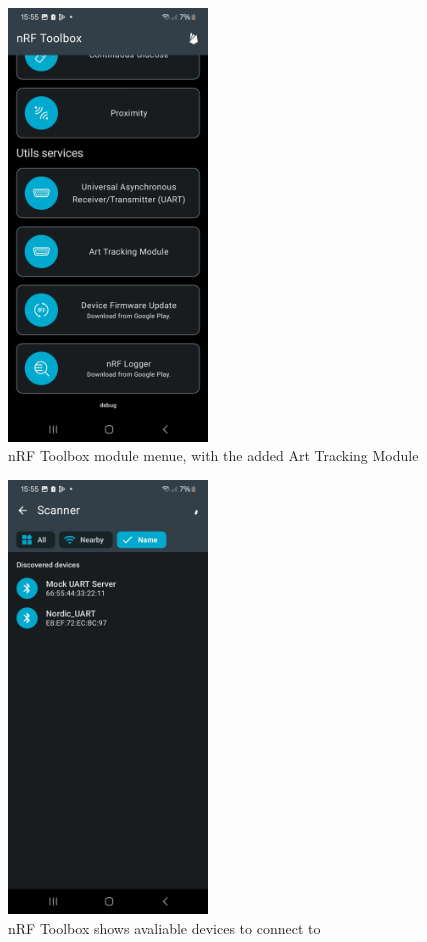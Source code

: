 \begin{figure}[ht!]
\centering
\includegraphics[width=200px]{graphics/nRF_toolbox_modules.jpg}
\caption{nRF Toolbox module menue, with the added Art Tracking Module}
\label{f:Toolbox_modules}
\end{figure}

\begin{figure}[ht!]
\centering
\includegraphics[width=200px]{graphics/nRF_toolbox_connect.jpg}
 \caption{nRF Toolbox shows avaliable devices to connect to}
\label{f:Toolbox_connect}
\end{figure}


